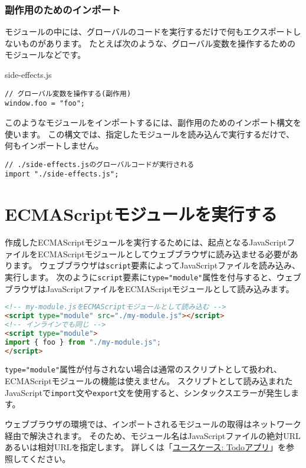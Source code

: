 \hypertarget{import-for-side-effect}{%
\subsubsection{副作用のためのインポート}\label{import-for-side-effect}}

モジュールの中には、グローバルのコードを実行するだけで何もエクスポートしないものがあります。
たとえば次のような、グローバル変数を操作するためのモジュールなどです。

\begin{listtitle}
side-effects.js
\end{listtitle}
\begin{lstlisting}
// グローバル変数を操作する(副作用)
window.foo = "foo";
\end{lstlisting}
\listend

このようなモジュールをインポートするには、副作用のためのインポート構文を使います。
この構文では、指定したモジュールを読み込んで実行するだけで、何もインポートしません。

\begin{lstlisting}
// ./side-effects.jsのグローバルコードが実行される
import "./side-effects.js";
\end{lstlisting}

\hypertarget{run-es-modules}{%
\section{ECMAScriptモジュールを実行する}\label{run-es-modules}}

作成したECMAScriptモジュールを実行するためには、起点となるJavaScriptファイルをECMAScriptモジュールとしてウェブブラウザに読み込ませる必要があります。
ウェブブラウザは\texttt{script}要素によってJavaScriptファイルを読み込み、実行します。
次のように\texttt{script}要素に\texttt{type="module"}属性を付与すると、ウェブブラウザはJavaScriptファイルをECMAScriptモジュールとして読み込みます。

\begin{lstlisting}[language=HTML]
<!-- my-module.jsをECMAScriptモジュールとして読み込む -->
<script type="module" src="./my-module.js"></script>
<!-- インラインでも同じ -->
<script type="module">
import { foo } from "./my-module.js";
</script>
\end{lstlisting}

\texttt{type="module"}属性が付与されない場合は通常のスクリプトとして扱われ、ECMAScriptモジュールの機能は使えません。
スクリプトとして読み込まれたJavaScriptで\texttt{import}文や\texttt{export}文を使用すると、シンタックスエラーが発生します。

ウェブブラウザの環境では、インポートされるモジュールの取得はネットワーク経由で解決されます。
そのため、モジュール名はJavaScriptファイルの絶対URLあるいは相対URLを指定します。
詳しくは「\hyperlink{todo-app}{ユースケース: Todoアプリ}」を参照してください。

